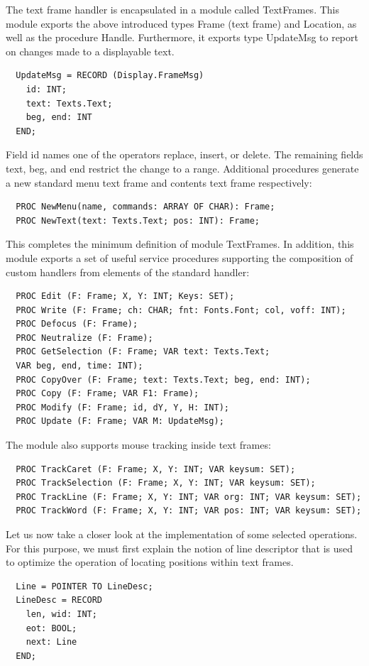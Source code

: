 The text frame handler is encapsulated in a module called TextFrames. This module exports the
above introduced types Frame (text frame) and Location, as well as the procedure Handle.
Furthermore, it exports type UpdateMsg to report on changes made to a displayable text.
\begin{verbatim}
  UpdateMsg = RECORD (Display.FrameMsg)
    id: INT;
    text: Texts.Text;
    beg, end: INT
  END;
\end{verbatim}

Field id names one of the operators replace, insert, or delete. The remaining fields text, beg, and
end restrict the change to a range. Additional procedures generate a new standard menu text frame
and contents text frame respectively:
\begin{verbatim}
  PROC NewMenu(name, commands: ARRAY OF CHAR): Frame;
  PROC NewText(text: Texts.Text; pos: INT): Frame;
\end{verbatim}

This completes the minimum definition of module TextFrames. In addition, this module exports a
set of useful service procedures supporting the composition of custom handlers from elements of
the standard handler:
\begin{verbatim}
  PROC Edit (F: Frame; X, Y: INT; Keys: SET);
  PROC Write (F: Frame; ch: CHAR; fnt: Fonts.Font; col, voff: INT);
  PROC Defocus (F: Frame);
  PROC Neutralize (F: Frame);
  PROC GetSelection (F: Frame; VAR text: Texts.Text;
  VAR beg, end, time: INT);
  PROC CopyOver (F: Frame; text: Texts.Text; beg, end: INT);
  PROC Copy (F: Frame; VAR F1: Frame);
  PROC Modify (F: Frame; id, dY, Y, H: INT);
  PROC Update (F: Frame; VAR M: UpdateMsg);
\end{verbatim}

The module also supports mouse tracking inside text frames:
\begin{verbatim}
  PROC TrackCaret (F: Frame; X, Y: INT; VAR keysum: SET);
  PROC TrackSelection (F: Frame; X, Y: INT; VAR keysum: SET);
  PROC TrackLine (F: Frame; X, Y: INT; VAR org: INT; VAR keysum: SET);
  PROC TrackWord (F: Frame; X, Y: INT; VAR pos: INT; VAR keysum: SET);
\end{verbatim}

Let us now take a closer look at the implementation of some selected operations. For this purpose,
we must first explain the notion of line descriptor that is used to optimize the operation of locating
positions within text frames.
\begin{verbatim}
  Line = POINTER TO LineDesc;
  LineDesc = RECORD
    len, wid: INT;
    eot: BOOL;
    next: Line
  END;
\end{verbatim}


